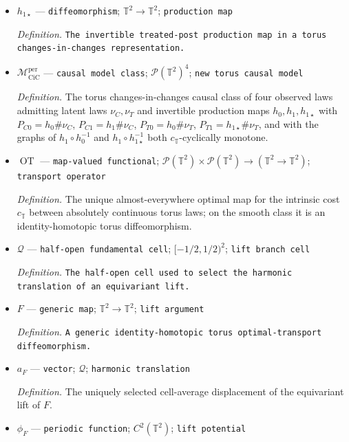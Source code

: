 \documentclass{article}
\begin{document}
\begin{itemize}
  \item \(h_{1\star}\) --- \texttt{diffeomorphism}; \(\mathbb T^2\to\mathbb T^2\); \texttt{production map}
  \par\smallskip\noindent\emph{Definition.} \texttt{The invertible treated-\allowbreak{}post production map in a torus changes-\allowbreak{}in-\allowbreak{}changes representation.}
  \item \(\mathcal M_{\mathrm{CiC}}^{\mathrm{per}}\) --- \texttt{causal model class}; \(\mathcal P(\mathbb T^2)^4\); \texttt{new torus causal model}
  \par\smallskip\noindent\emph{Definition.} The torus changes-in-changes causal class of four observed laws admitting latent laws \(\nu_C,\nu_T\) and invertible production maps \(h_0,h_1,h_{1\star}\) with \(P_{C0}=h_0\#\nu_C\), \(P_{C1}=h_1\#\nu_C\), \(P_{T0}=h_0\#\nu_T\), \(P_{T1}=h_{1\star}\#\nu_T\), and with the graphs of \(h_1\circ h_0^{-1}\) and \(h_1\circ h_{1\star}^{-1}\) both \(c_{\mathbb T}\)-cyclically monotone.
  \item \(\operatorname{OT}\) --- \texttt{map-\allowbreak{}valued functional}; \(\mathcal P(\mathbb T^2)\times\mathcal P(\mathbb T^2)\to(\mathbb T^2\to\mathbb T^2)\); \texttt{transport operator}
  \par\smallskip\noindent\emph{Definition.} The unique almost-everywhere optimal map for the intrinsic cost \(c_{\mathbb T}\) between absolutely continuous torus laws; on the smooth class it is an identity-homotopic torus diffeomorphism.
  \item \(\mathcal Q\) --- \texttt{half-\allowbreak{}open fundamental cell}; \([-1/2,1/2)^2\); \texttt{lift branch cell}
  \par\smallskip\noindent\emph{Definition.} \texttt{The half-\allowbreak{}open cell used to select the harmonic translation of an equivariant lift.}
  \item \(F\) --- \texttt{generic map}; \(\mathbb T^2\to\mathbb T^2\); \texttt{lift argument}
  \par\smallskip\noindent\emph{Definition.} \texttt{A generic identity-\allowbreak{}homotopic torus optimal-\allowbreak{}transport diffeomorphism.}
  \item \(a_F\) --- \texttt{vector}; \(\mathcal Q\); \texttt{harmonic translation}
  \par\smallskip\noindent\emph{Definition.} The uniquely selected cell-average displacement of the equivariant lift of \(F\).
  \item \(\phi_F\) --- \texttt{periodic function}; \(C^2(\mathbb T^2)\); \texttt{lift potential}

\end{itemize}
\end{document}
